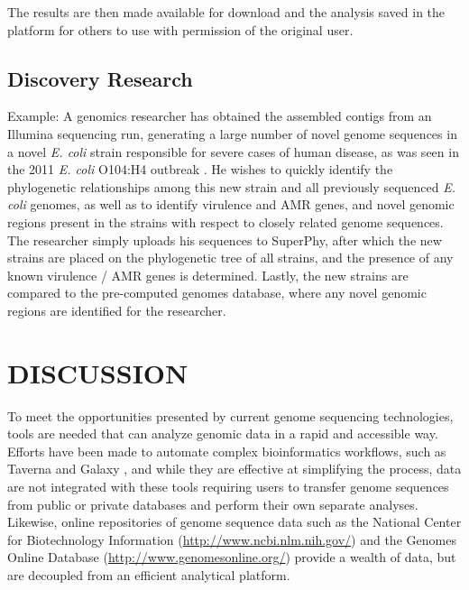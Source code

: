 \documentclass[a4paper,twoside]{article}
\begin{document}
The results are then made available for download and the analysis saved in the platform for others to use with permission of the original user.

\subsection{Discovery Research}
Example: A genomics researcher has obtained the assembled contigs from an Illumina sequencing run, generating a large number of novel genome sequences in a novel \textit{E. coli} strain responsible for severe cases of human disease, as was seen in the 2011 \textit{E. coli} O104:H4 outbreak \cite{mellmann_prospective_2011}. He wishes to quickly identify the phylogenetic relationships among this new strain and all previously sequenced \textit{E. coli} genomes, as well as to identify virulence and AMR genes, and novel genomic regions present in the strains with respect to closely related genome sequences. The researcher simply uploads his sequences to SuperPhy, after which the new strains are placed on the phylogenetic tree of all strains, and the presence of any known virulence / AMR genes is determined. Lastly, the new strains are compared to the pre-computed genomes database, where any novel genomic regions are identified for the researcher.

\section{\uppercase{Discussion}}
\label{sec:discussion}

To meet the opportunities presented by current genome sequencing technologies, tools are needed that can analyze genomic data in a rapid and accessible way. Efforts have been made to automate complex bioinformatics workflows, such as Taverna \cite{lanzen_taverna_2008} and Galaxy \cite{goecks_galaxy:_2010}, and while they are effective at simplifying the process, data are not integrated with these tools requiring users to transfer genome sequences from public or private databases and perform their own separate analyses. Likewise, online repositories of genome sequence data such as the National Center for Biotechnology Information (\url{http://www.ncbi.nlm.nih.gov/}) and the Genomes Online Database (\url{http://www.genomesonline.org/}) provide a wealth of data, but are decoupled from an efficient analytical platform. 
\end{document}
